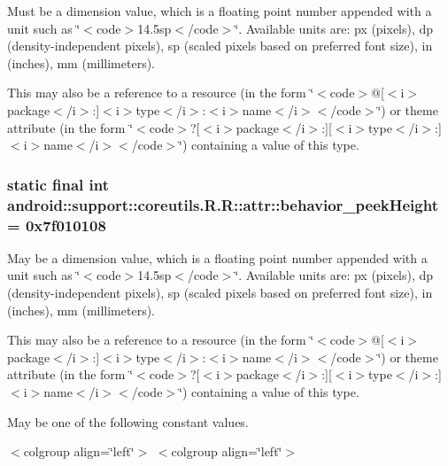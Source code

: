 Must be a dimension value, which is a floating point number appended with a unit such as \char`\"{}$<$code$>$14.5sp$<$/code$>$\char`\"{}. Available units are: px (pixels), dp (density-independent pixels), sp (scaled pixels based on preferred font size), in (inches), mm (millimeters). 

This may also be a reference to a resource (in the form \char`\"{}$<$code$>$@\mbox{[}$<$i$>$package$<$/i$>$:\mbox{]}$<$i$>$type$<$/i$>$:$<$i$>$name$<$/i$>$$<$/code$>$\char`\"{}) or theme attribute (in the form \char`\"{}$<$code$>$?\mbox{[}$<$i$>$package$<$/i$>$:\mbox{]}\mbox{[}$<$i$>$type$<$/i$>$:\mbox{]}$<$i$>$name$<$/i$>$$<$/code$>$\char`\"{}) containing a value of this type. \hypertarget{classandroid_1_1support_1_1coreutils_1_1_r_1_1attr_872a8a48a77d6f267635073e38a4a7d9}{
\subsubsection[{behavior\_\-peekHeight}]{\setlength{\rightskip}{0pt plus 5cm}static final int android::support::coreutils.R.R::attr::behavior\_\-peekHeight = 0x7f010108}}
\label{classandroid_1_1support_1_1coreutils_1_1_r_1_1attr_872a8a48a77d6f267635073e38a4a7d9}


May be a dimension value, which is a floating point number appended with a unit such as \char`\"{}$<$code$>$14.5sp$<$/code$>$\char`\"{}. Available units are: px (pixels), dp (density-independent pixels), sp (scaled pixels based on preferred font size), in (inches), mm (millimeters). 

This may also be a reference to a resource (in the form \char`\"{}$<$code$>$@\mbox{[}$<$i$>$package$<$/i$>$:\mbox{]}$<$i$>$type$<$/i$>$:$<$i$>$name$<$/i$>$$<$/code$>$\char`\"{}) or theme attribute (in the form \char`\"{}$<$code$>$?\mbox{[}$<$i$>$package$<$/i$>$:\mbox{]}\mbox{[}$<$i$>$type$<$/i$>$:\mbox{]}$<$i$>$name$<$/i$>$$<$/code$>$\char`\"{}) containing a value of this type. 

May be one of the following constant values. \begin{TabularC}{0}
\hline
\end{TabularC}
$<$colgroup align=\char`\"{}left\char`\"{}$>$ $<$colgroup align=\char`\"{}left\char`\"{}$>$ 

